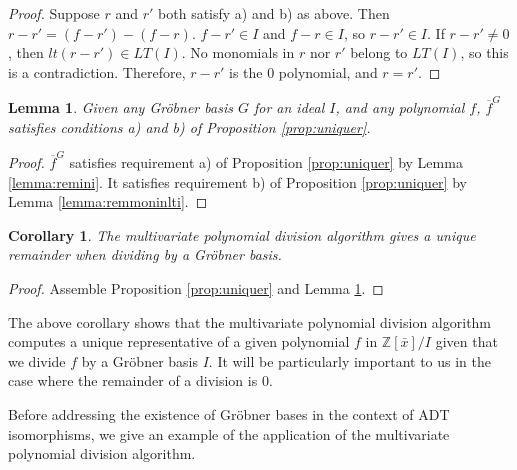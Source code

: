 \documentclass{msthesis}
\newtheorem{lemma}[theorem]{Lemma}
\newtheorem{corollary}[theorem]{Corollary}
\theoremstyle{definition}
\newcommand{\ints}{\mathbb{Z}}
\begin{document}
\begin{proof}
    Suppose $r$ and $r'$ both satisfy a) and b) as above.
    Then $r - r' = (f - r') - (f - r)$.  $f - r' \in I$ and $f - r \in I$, so $r - r' \in I$.  If $r - r' \neq 0$, then $lt(r - r') \in LT(I)$.  No monomials in $r$ nor $r'$ belong to $LT(I)$, so this is a contradiction.  Therefore, $r - r'$ is the $0$ polynomial, and $r = r'$.
\end{proof}

\begin{lemma}\label{lemma:auxgb}
    Given any Gr\"obner basis $G$ for an ideal $I$, and any polynomial $f$, $\overline{f}^G$ satisfies conditions a) and b) of Proposition \ref{prop:uniquer}.
\end{lemma}
\begin{proof}
    $\overline{f}^G$ satisfies requirement a) of Proposition \ref{prop:uniquer} by Lemma \ref{lemma:remini}. It satisfies requirement b) of Proposition \ref{prop:uniquer} by Lemma \ref{lemma:remmoninlti}.
\end{proof}

\begin{corollary}\label{cor:uniquer}
    The multivariate polynomial division algorithm gives a unique remainder when dividing by a Gr\"obner basis.
\end{corollary}
\begin{proof}
    Assemble Proposition \ref{prop:uniquer} and Lemma \ref{lemma:auxgb}.
\end{proof}

The above corollary shows that the multivariate polynomial division algorithm computes a unique representative of a given polynomial $f$ in $\ints[\bar{x}]/I$ given that we divide $f$ by a Gr\"obner basis $I$.  It will be particularly important to us in the case where the remainder of a division is $0$.

Before addressing the existence of Gr\"obner bases in the context of ADT isomorphisms, we give an example of the application of the multivariate polynomial division algorithm.  
\end{document}
